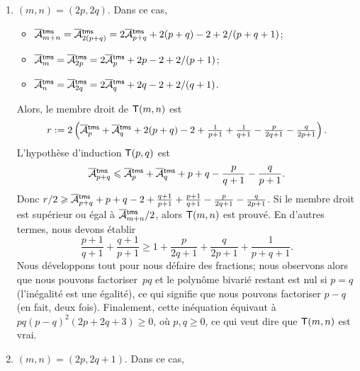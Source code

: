 \begin{enumerate}

  \item \((m,n) = (2p,2q)\). Dans ce cas,
    \begin{itemize}

      \item \(\OM{\fun{tms}}{m+n} = \OM{\fun{tms}}{2(p+q)} =
        2\OM{\fun{tms}}{p+q} + 2(p+q) - 2 + 2/(p+q+1)\);

      \item \(\OM{\fun{tms}}{m} = \OM{\fun{tms}}{2p} =
        2\OM{\fun{tms}}{p} + 2p - 2 + 2/(p+1)\);

      \item \(\OM{\fun{tms}}{n} = \OM{\fun{tms}}{2q} =
        2\OM{\fun{tms}}{q} + 2q - 2 + 2/(q+1)\).

    \end{itemize}
    Alors, le membre droit de \(\textsf{T}({m,n})\) est
    \begin{equation*}
      r := 2\left(\OM{\fun{tms}}{p} + \OM{\fun{tms}}{q} + 2(p+q) - 2 +
        \tfrac{1}{p+1} + \tfrac{1}{q+1} - \tfrac{p}{2q+1} -
        \tfrac{q}{2p+1}\right).
    \end{equation*}
    L'hypothèse d'induction \(\textsf{T}({p,q})\) est
    \begin{equation*}
      \OM{\fun{tms}}{p+q} \leqslant \OM{\fun{tms}}{p} +
      \OM{\fun{tms}}{q} + p + q - \frac{p}{q+1} - \frac{q}{p+1}.
    \end{equation*}
    Donc \(r/2 \geqslant \OM{\fun{tms}}{p+q} + p + q - 2 +
    \tfrac{q+1}{p+1} + \tfrac{p+1}{q+1} - \tfrac{p}{2q+1} -
    \tfrac{q}{2p+1}\). Si le membre droit est supérieur ou égal à
    \(\OM{\fun{tms}}{m+n}/2\), alors \(\textsf{T}({m,n})\) est
    prouvé. En d'autres termes, nous devons établir
    \begin{equation*}
      \frac{p+1}{q+1} + \frac{q+1}{p+1} \geqslant 1 +
      \frac{p}{2q+1} + \frac{q}{2p+1} + \frac{1}{p+q+1}.
    \end{equation*}
    Nous développons tout pour nous défaire des fractions; nous
    observons alors que nous pouvons factoriser~\(pq\) et le polynôme
    bivarié restant est nul si \(p=q\) (l'inégalité est une égalité),
    ce qui signifie que nous pouvons factoriser \(p-q\) (en fait, deux
    fois). Finalement, cette inéquation équivaut à
    \(pq(p-q)^2(2p+2q+3) \geqslant 0\), où \(p,q \geqslant 0\), ce qui
    veut dire que \(\textsf{T}({m,n})\) est vrai.

  \item \((m,n) = (2p,2q+1)\). Dans ce cas,
    \begin{itemize}


\end{itemize}
\end{enumerate}
